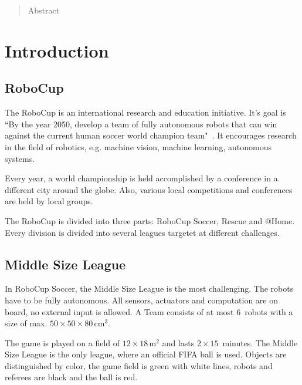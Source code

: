 \documentclass[12pt,a4paper]{article}
\newcommand{\MSL}{Middle Size League\xspace}
\begin{document}


\tableofcontents
\clearpage
\pagestyle{plain}



\begin{abstract}
Abstract

\end{abstract}

\clearpage

\section{Introduction}


\subsection{RoboCup}

The RoboCup is an international research and education initiative. 
It's goal is ``By the year 2050, develop a team of fully autonomous robots that can win against the current human soccer world champion team"~\cite{robocup.org}.
It encourages research in the field of robotics, e.g. machine vision, machine learning, autonomous systems.


Every year, a world championship is held accomplished by a conference in a different city around the globe.
Also, various local competitions and conferences are held by local groups.

The RoboCup is divided into three parts: RoboCup Soccer, Rescue and @Home.
Every division is divided into several leagues targetet at different challenges.


\subsection{\MSL}

In RoboCup Soccer, the \MSL is the most challenging.
The robots have to be fully autonomous.
All sensors, actuators and computation are on board, no external input is allowed.
A Team consists of at most 6~robots with a size of max. $50\times50\times80$\,cm$^3$.

The game is played on a field of $12\times18$\,m$^2$ and lasts $2\times15$~minutes.
The \MSL is the only league, where an official FIFA ball is used.
Objects are distinguished by color, the game field is green with white lines, robots and referees are black and the ball is red.
\end{document}
